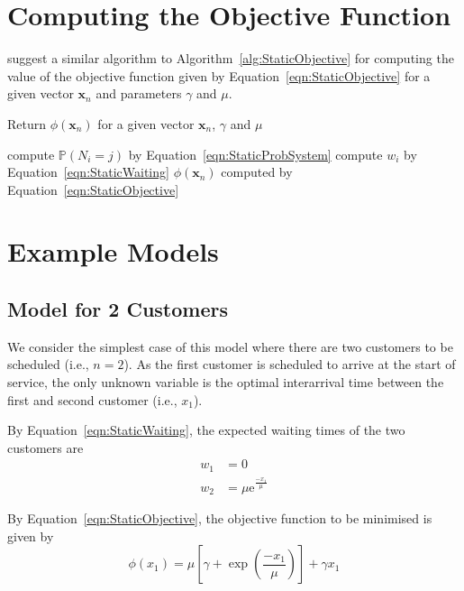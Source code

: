 \section{Computing the Objective Function}
\citet{Pegden} suggest a similar algorithm to Algorithm~\ref{alg:StaticObjective} for computing the value of the objective function given by Equation~\ref{eqn:StaticObjective} for a given vector $\mathbf{x}_{n}$ and parameters $\gamma$ and $\mu$.
\begin{algorithm}[htb]
\caption{Return $\phi (\mathbf{x}_{n})$ for a given vector $\mathbf{x}_{n}$, $\gamma$ and $\mu$}
\begin{algorithmic}
    		\State compute $\mathbb{P} (N_{i} = j)$ by Equation~\ref{eqn:StaticProbSystem}
    	\EndFor
    \EndFor
    	\State compute $w_{i}$ by Equation~\ref{eqn:StaticWaiting}
    \EndFor
    \State \Return $\phi (\mathbf{x}_{n})$ computed by Equation~\ref{eqn:StaticObjective}
\EndFunction
\end{algorithmic}
\label{alg:StaticObjective}
\end{algorithm}

\section{Example Models}
\subsection{Model for 2 Customers}
\label{sec:StaticTwoCust}
We consider the simplest case of this model where there are two customers to be scheduled (i.e., $n = 2$). As the first customer is scheduled to arrive at the start of service, the only unknown variable is the optimal interarrival time between the first and second customer (i.e., $x_{1}$).

By Equation~\ref{eqn:StaticWaiting}, the expected waiting times of the two customers are
\begin{equation}
	\begin{split}
		w_{1} & = 0 \\
		w_{2} & = \mu \mathrm{e}^{\frac{- x_{1}}{\mu}}
	\end{split}
\end{equation}

By Equation~\ref{eqn:StaticObjective}, the objective function to be minimised is given by
\begin{equation}
	\phi (x_{1}) = \mu \left[ \gamma + \exp \left( \frac{- x_{1}}{\mu} \right) \right] + \gamma x_{1}
\end{equation}

